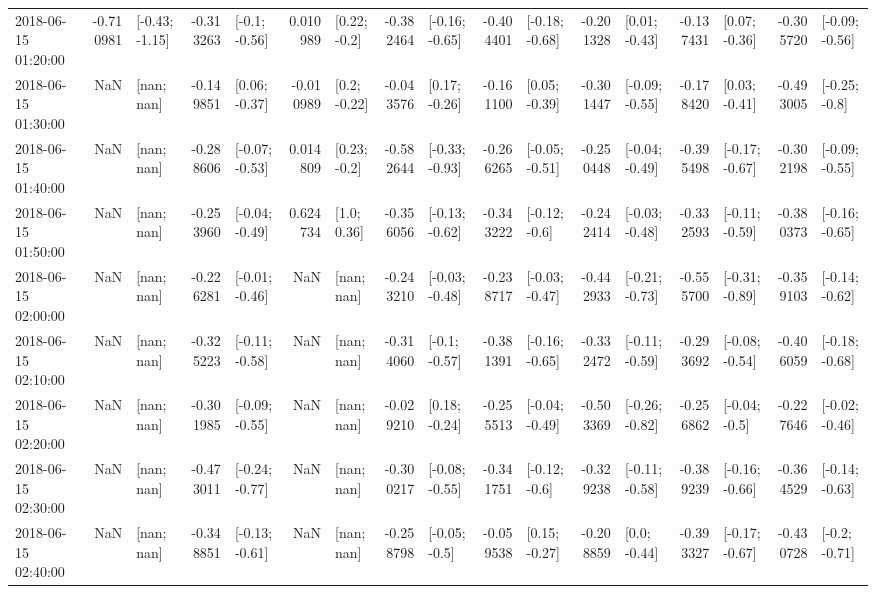 \begin{tabular}{lrlrlrlrlrlrlrlrl}
2018-06-15 01:20:00 & -0.710981 &  [-0.43; -1.15] & -0.313263 &   [-0.1; -0.56] &  0.010989 &    [0.22; -0.2] & -0.382464 &  [-0.16; -0.65] & -0.404401 &  [-0.18; -0.68] & -0.201328 &   [0.01; -0.43] & -0.137431 &   [0.07; -0.36] & -0.305720 &  [-0.09; -0.56] \\
2018-06-15 01:30:00 &       NaN &      [nan; nan] & -0.149851 &   [0.06; -0.37] & -0.010989 &    [0.2; -0.22] & -0.043576 &   [0.17; -0.26] & -0.161100 &   [0.05; -0.39] & -0.301447 &  [-0.09; -0.55] & -0.178420 &   [0.03; -0.41] & -0.493005 &   [-0.25; -0.8] \\
2018-06-15 01:40:00 &       NaN &      [nan; nan] & -0.288606 &  [-0.07; -0.53] &  0.014809 &    [0.23; -0.2] & -0.582644 &  [-0.33; -0.93] & -0.266265 &  [-0.05; -0.51] & -0.250448 &  [-0.04; -0.49] & -0.395498 &  [-0.17; -0.67] & -0.302198 &  [-0.09; -0.55] \\
2018-06-15 01:50:00 &       NaN &      [nan; nan] & -0.253960 &  [-0.04; -0.49] &  0.624734 &     [1.0; 0.36] & -0.356056 &  [-0.13; -0.62] & -0.343222 &   [-0.12; -0.6] & -0.242414 &  [-0.03; -0.48] & -0.332593 &  [-0.11; -0.59] & -0.380373 &  [-0.16; -0.65] \\
2018-06-15 02:00:00 &       NaN &      [nan; nan] & -0.226281 &  [-0.01; -0.46] &       NaN &      [nan; nan] & -0.243210 &  [-0.03; -0.48] & -0.238717 &  [-0.03; -0.47] & -0.442933 &  [-0.21; -0.73] & -0.555700 &  [-0.31; -0.89] & -0.359103 &  [-0.14; -0.62] \\
2018-06-15 02:10:00 &       NaN &      [nan; nan] & -0.325223 &  [-0.11; -0.58] &       NaN &      [nan; nan] & -0.314060 &   [-0.1; -0.57] & -0.381391 &  [-0.16; -0.65] & -0.332472 &  [-0.11; -0.59] & -0.293692 &  [-0.08; -0.54] & -0.406059 &  [-0.18; -0.68] \\
2018-06-15 02:20:00 &       NaN &      [nan; nan] & -0.301985 &  [-0.09; -0.55] &       NaN &      [nan; nan] & -0.029210 &   [0.18; -0.24] & -0.255513 &  [-0.04; -0.49] & -0.503369 &  [-0.26; -0.82] & -0.256862 &   [-0.04; -0.5] & -0.227646 &  [-0.02; -0.46] \\
2018-06-15 02:30:00 &       NaN &      [nan; nan] & -0.473011 &  [-0.24; -0.77] &       NaN &      [nan; nan] & -0.300217 &  [-0.08; -0.55] & -0.341751 &   [-0.12; -0.6] & -0.329238 &  [-0.11; -0.58] & -0.389239 &  [-0.16; -0.66] & -0.364529 &  [-0.14; -0.63] \\
2018-06-15 02:40:00 &       NaN &      [nan; nan] & -0.348851 &  [-0.13; -0.61] &       NaN &      [nan; nan] & -0.258798 &   [-0.05; -0.5] & -0.059538 &   [0.15; -0.27] & -0.208859 &    [0.0; -0.44] & -0.393327 &  [-0.17; -0.67] & -0.430728 &   [-0.2; -0.71] \\

\end{tabular}
